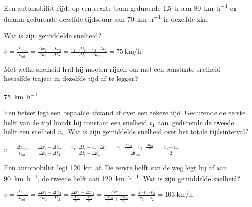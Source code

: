 \documentclass{ximera}
\begin{document}
	\author{Bart Lambregs}
    \xmsource\xmuitleg

\begin{exercise}
    Een automobilist rijdt op een rechte baan gedurende \SI{1,5}{\hour} aan \SI{80}{\kilo\meter\per\hour} en daarna gedurende dezelfde tijdsduur aan
    \SI{70}{\kilo\meter\per\hour} in dezelfde zin.
    \begin{question} 
        Wat is zijn gemiddelde snelheid?
        \begin{oplossing}
            \(\overline{v} = \frac{\Delta x_{\text{tot}}}{t_{\text{tot}}} = \frac{\Delta x_1 + \Delta x_2}{\Delta t_1 + \Delta t_2} = \frac{v_1 \cdot \Delta t_1 + v_2 \cdot \Delta t_2}{\Delta t_1 + \Delta t_2} = \SI{75}{\km\per\hour}\)
        \end{oplossing}
    \end{question}

    \begin{question} 
        Met welke snelheid had hij moeten rijden om met een constante snelheid hetzelfde traject in dezelfde tijd af te leggen? 
        \begin{oplossing}
            \SI{75}{\km\per\hour}
        \end{oplossing}
    \end{question}
\end{exercise}

\begin{exercise}
    Een fietser legt een bepaalde afstand af over een zekere tijd. Gedurende de eerste helft van de tijd houdt hij constant een snelheid $v_1$ aan, gedurende de tweede helft een snelheid $v_2$. Wat is zijn gemiddelde snelheid over het totale tijdsinterval?
    \begin{oplossing}
        \(\overline{v} = \frac{\Delta x_{\text{tot}}}{t_{\text{tot}}} = \frac{\Delta x_1 + \Delta x_2}{\Delta t_1 + \Delta t_2} = \frac{v_1 \cdot \Delta t_1 + v_2 \cdot \Delta t_2}{\Delta t_1 + \Delta t_2} = \frac{v_1 \cdot \frac{\Delta t_{\text{tot}}}{2} + v_2 \cdot \frac{\Delta t_{\text{tot}}}{2}}{\Delta t_{\text{tot}}} =\frac{v_1+v_2}{2} \)
    \end{oplossing}
\end{exercise}

\begin{exercise}
    Een automobilist legt \SI{120}{km} af. De eerste helft van de weg legt hij af aan \SI{90}{\kilo\meter\per\hour}, de tweede helft aan \SI{120}{\kilo\meter\per\hour}. Wat is zijn gemiddelde snelheid?
    \begin{oplossing}
        \(\overline{v} = \frac{\Delta x_{\text{tot}}}{t_{\text{tot}}} = \frac{\Delta x_1 + \Delta x_2}{\Delta t_1 + \Delta t_2} =  \frac{\Delta x_1 + \Delta x_2}{\frac{\Delta x_1}{v_1} + \frac{\Delta x_2}{v_2}} = \frac{\Delta x_{\text{tot}}}{\frac{\Delta x_{\text{tot}}}{v_1} + \frac{\Delta x_{\text{tot}}}{v_2}} = \frac{2\cdot v_1 \cdot v_2}{v_1 + v_2} = \SI{103}{\km\per\hour} \)
    \end{oplossing}
\end{exercise}
\end{document}
